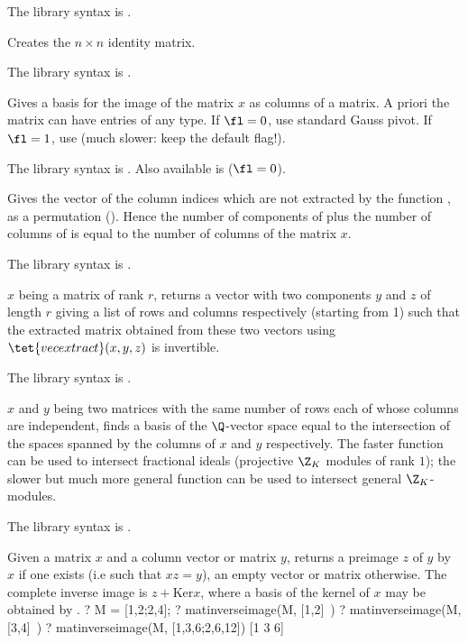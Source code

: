 The library syntax is .

\label{se:matid}
Creates the $n\times n$ identity matrix.

The library syntax is .

\label{se:matimage}
Gives a basis for the image of the
matrix $x$ as columns of a matrix. A priori the matrix can have entries of
any type. If $\fl=0$, use standard Gauss pivot. If $\fl=1$, use
 (much slower: keep the default flag!).

The library syntax is .
Also available is  ($\fl=0$).

\label{se:matimagecompl}
Gives the vector of the column indices which
are not extracted by the function , as a permutation
(). Hence the number of
components of  plus the number of columns of
 is equal to the number of columns of the matrix $x$.

The library syntax is .

\label{se:matindexrank}
$x$ being a matrix of rank $r$, returns a vector with two
 components $y$ and $z$ of length $r$ giving a list of rows
and columns respectively (starting from 1) such that the extracted matrix
obtained from these two vectors using $\tet{vecextract}(x,y,z)$ is
invertible.

The library syntax is .

\label{se:matintersect}
$x$ and $y$ being two matrices with the same
number of rows each of whose columns are independent, finds a basis of the
$\Q$-vector space equal to the intersection of the spaces spanned by the
columns of $x$ and $y$ respectively. The faster function
 can be used to intersect fractional ideals (projective
$\Z_K$ modules of rank $1$); the slower but much more general function
 can be used to intersect general $\Z_K$-modules.

The library syntax is .

\label{se:matinverseimage}
Given a matrix $x$ and
a column vector or matrix $y$, returns a preimage $z$ of $y$ by $x$ if one
exists (i.e such that $x z = y$), an empty vector or matrix otherwise. The
complete inverse image is $z + \text{Ker} x$, where a basis of the kernel of
$x$ may be obtained by .
\bprog
? M = [1,2;2,4];
? matinverseimage(M, [1,2]~)
? matinverseimage(M, [3,4]~)
? matinverseimage(M, [1,3,6;2,6,12])
[1 3 6]

